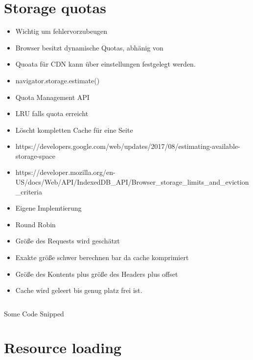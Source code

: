 \section{Storage quotas}
\begin{itemize}
	\item Wichtig um fehlervorzubeugen
	\item Browser besitzt dynamische Quotas, abhänig von 
	\item Quoata für CDN kann über einstellungen festgelegt werden.
	\item navigator.storage.estimate()
	\item Quota Management API
	\item 	LRU falls quota erreicht
	\item 	Löscht kompletten Cache für eine Seite
	\item https://developers.google.com/web/updates/2017/08/estimating-available-storage-space
	\item https://developer.mozilla.org/en-US/docs/Web/API/IndexedDB_API/Browser_storage_limits_and_eviction_criteria
	\item Eigene Implemtierung
	\item 	Round Robin
	\item 	Größe des Requests wird geschätzt
	\item 	Exakte größe schwer berechnen bar da cache komprimiert
	\item 	Größe des Kontents plus größe des Headers plus offset
	\item 	Cache wird geleert bis genug platz frei ist.
\end{itemize}


\begin{listing}[h]
	\inputminted{ruby}{listings/context-data-transform.rb}
	\caption{Some Code Snipped}
	\label{lst:code-snipped}
\end{listing}

\section{Resource loading}
